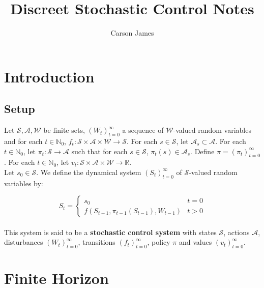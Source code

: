 \documentclass[12pt]{amsart}
\newcommand{\N}{\mathbb{N}}
\newcommand{\R}{\mathbb{R}}
\newcommand{\MA}{\mathcal{A}}
\newcommand{\MS}{\mathcal{S}}
\newcommand{\MW}{\mathcal{W}}
\begin{document}
\title{Discreet Stochastic Control Notes}
\author[James]{Carson James}
\maketitle


\tableofcontents

\section{Introduction}

\subsection{Setup}

Let $\MS, \MA, \MW$ be finite sets, $(W_t)_{t=0}^{\infty}$ a sequence of $\MW$-valued random variables  and for each $t \in \N_0$, $f_t:\MS \times \MA \times \MW \rightarrow \MS$. For each $s \in \MS$, let $\MA_s \subset \MA$. For each $t \in \N_0$, let $\pi_t: \MS \rightarrow \MA$ such that for each $s \in \MS$, $\pi_t(s) \in \MA_s$. Define $\pi = (\pi_t)_{t=0}^{\infty}$. For each $t \in \N_0$, let $v_t:\MS \times \MA \times \MW \rightarrow \R$. \vspace{5mm}\\ Let $s_0 \in \MS$. We define the dynamical system $(S_t)_{t=0}^{\infty}$ of $\MS$-valued random variables by: 

\[
S_t = 
\begin{cases}
s_0 & t=0 \\
f(S_{t-1}, \pi_{t-1}(S_{t-1}), W_{t-1}) &t>0
\end{cases}
\]
\\This system is said to be a \textbf{stochastic control system} with states $\MS$, actions $\MA$, disturbances $(W_t)_{t=0}^{\infty}$, transitions $(f_t)_{t=0}^{\infty}$, policy $\pi$ and values $(v_t)_{t=0}^{\infty}$. 

\section{Finite Horizon}
\end{document}
